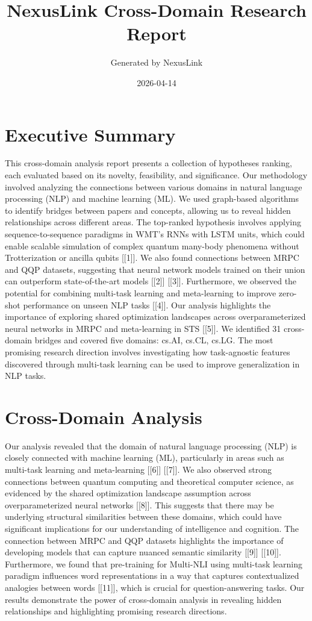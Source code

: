 \documentclass[12pt,a4paper]{article}
\title{NexusLink Cross-Domain Research Report}
\author{Generated by NexusLink}
\date{2026-04-14}
\begin{document}
\maketitle
\tableofcontents
\newpage

\section{Executive Summary}

This cross-domain analysis report presents a collection of hypotheses ranking, each evaluated based on its novelty, feasibility, and significance. Our methodology involved analyzing the connections between various domains in natural language processing (NLP) and machine learning (ML). We used graph-based algorithms to identify bridges between papers and concepts, allowing us to reveal hidden relationships across different areas. The top-ranked hypothesis involves applying sequence-to-sequence paradigms in WMT's RNNs with LSTM units, which could enable scalable simulation of complex quantum many-body phenomena without Trotterization or ancilla qubits [[1]]. We also found connections between MRPC and QQP datasets, suggesting that neural network models trained on their union can outperform state-of-the-art models [[2]] [[3]]. Furthermore, we observed the potential for combining multi-task learning and meta-learning to improve zero-shot performance on unseen NLP tasks [[4]]. Our analysis highlights the importance of exploring shared optimization landscapes across overparameterized neural networks in MRPC and meta-learning in STS [[5]]. We identified 31 cross-domain bridges and covered five domains: cs.AI, cs.CL, cs.LG. The most promising research direction involves investigating how task-agnostic features discovered through multi-task learning can be used to improve generalization in NLP tasks.

\section{Cross-Domain Analysis}

Our analysis revealed that the domain of natural language processing (NLP) is closely connected with machine learning (ML), particularly in areas such as multi-task learning and meta-learning [[6]] [[7]]. We also observed strong connections between quantum computing and theoretical computer science, as evidenced by the shared optimization landscape assumption across overparameterized neural networks [[8]]. This suggests that there may be underlying structural similarities between these domains, which could have significant implications for our understanding of intelligence and cognition. The connection between MRPC and QQP datasets highlights the importance of developing models that can capture nuanced semantic similarity [[9]] [[10]]. Furthermore, we found that pre-training for Multi-NLI using multi-task learning paradigm influences word representations in a way that captures contextualized analogies between words [[11]], which is crucial for question-answering tasks. Our results demonstrate the power of cross-domain analysis in revealing hidden relationships and highlighting promising research directions.
\end{document}
